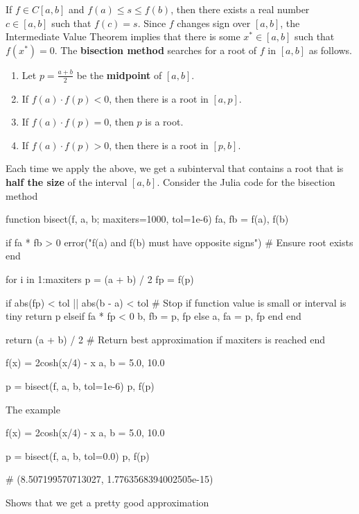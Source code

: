 \documentclass{report}
\begin{document}
\begin{itemize}
    If $f \in C[a,b]$ and $f(a) \leq s \leq f(b)$, then there exists a real number $c \in [a,b]$ such that $f(c) = s$.
    \bigbreak \noindent 
    Since $f$ changes sign over $[a,b]$, the Intermediate Value Theorem implies that there is some $x^* \in [a,b]$ such that $f(x^*) = 0$.
    The \textbf{bisection method} searches for a root of $f$ in $[a,b]$ as follows.
    \begin{enumerate}
        \item Let $p = \frac{a+b}{2}$ be the \textbf{midpoint} of $[a,b]$.
        \item If $f(a) \cdot f(p) < 0$, then there is a root in $[a,p]$.
        \item If $f(a) \cdot f(p) = 0$, then $p$ is a root.
        \item If $f(a) \cdot f(p) > 0$, then there is a root in $[p,b]$.
    \end{enumerate}
    Each time we apply the above, we get a subinterval that contains a root that is \textbf{half the size} of the interval $[a,b]$.
    \bigbreak \noindent 
    Consider the Julia code for the bisection method 
    \bigbreak \noindent 
    \begin{jlcode}
function bisect(f, a, b; maxiters=1000, tol=1e-6)
    fa, fb = f(a), f(b)
    
    if fa * fb > 0
        error("f(a) and f(b) must have opposite signs")  # Ensure root exists
    end
    
    for i in 1:maxiters
        p = (a + b) / 2
        fp = f(p)

        if abs(fp) < tol || abs(b - a) < tol  # Stop if function value is small or interval is tiny
            return p
        elseif fa * fp < 0
            b, fb = p, fp
        else
            a, fa = p, fp
        end
    end
    
    return (a + b) / 2  # Return best approximation if maxiters is reached
end

f(x) = 2cosh(x/4) - x
a, b = 5.0, 10.0

p = bisect(f, a, b, tol=1e-6)
p, f(p)
    \end{jlcode}
    \bigbreak \noindent 
    The example
    \bigbreak \noindent 
    \begin{jlcode}
        f(x) = 2cosh(x/4) - x
        a, b = 5.0, 10.0

        p = bisect(f, a, b, tol=0.0)
        p, f(p)

        # (8.507199570713027, 1.7763568394002505e-15)
    \end{jlcode}
    \bigbreak \noindent 
    Shows that we get a pretty good approximation


\end{itemize}
\end{document}
